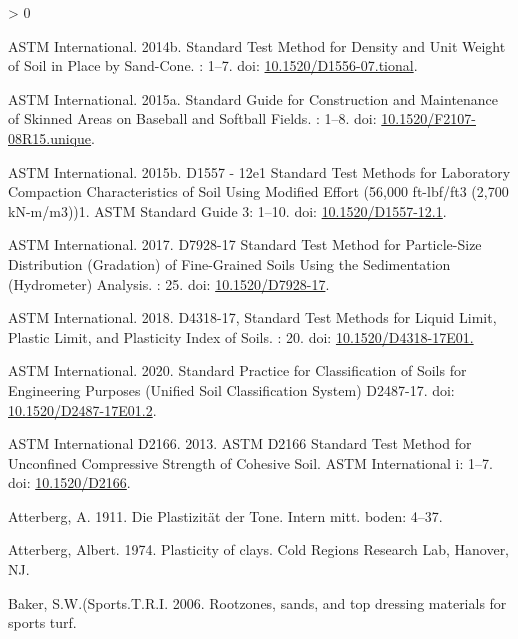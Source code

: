 \documentclass[
  letterpaper,
  openany]{book}
\newlength{\cslhangindent}
\newenvironment{CSLReferences}[2] %
 {%
  \setlength{\parindent}{0pt}
  \ifodd #1 \everypar{\setlength{\hangindent}{\cslhangindent}}\ignorespaces\fi
  \ifnum #2 > 0
  \setlength{\parskip}{#2\baselineskip}
  \fi
 }%
 {}
\begin{document}
\begin{CSLReferences}{1}{0}
\leavevmode\hypertarget{ref-ASTMD1556-07}{}%
ASTM International. 2014b. {Standard Test Method for Density and Unit Weight of Soil in Place by Sand-Cone}. : 1--7. doi: \href{https://doi.org/10.1520/D1556-07.tional}{10.1520/D1556-07.tional}.

\leavevmode\hypertarget{ref-ASTMF2107-08}{}%
ASTM International. 2015a. {Standard Guide for Construction and Maintenance of Skinned Areas on Baseball and Softball Fields}. : 1--8. doi: \href{https://doi.org/10.1520/F2107-08R15.unique}{10.1520/F2107-08R15.unique}.

\leavevmode\hypertarget{ref-ASTMD15572015}{}%
ASTM International. 2015b. {D1557 - 12e1 Standard Test Methods for Laboratory Compaction Characteristics of Soil Using Modified Effort (56,000 ft-lbf/ft3 (2,700 kN-m/m3))1}. ASTM Standard Guide 3: 1--10. doi: \href{https://doi.org/10.1520/D1557-12.1}{10.1520/D1557-12.1}.

\leavevmode\hypertarget{ref-ASTMD79282017}{}%
ASTM International. 2017. {D7928-17 Standard Test Method for Particle-Size Distribution (Gradation) of Fine-Grained Soils Using the Sedimentation (Hydrometer) Analysis}. : 25. doi: \href{https://doi.org/10.1520/D7928-17}{10.1520/D7928-17}.

\leavevmode\hypertarget{ref-ASTMD43182018}{}%
ASTM International. 2018. {D4318-17, Standard Test Methods for Liquid Limit, Plastic Limit, and Plasticity Index of Soils}. : 20. doi: \href{https://doi.org/10.1520/D4318-17E01.}{10.1520/D4318-17E01.}

\leavevmode\hypertarget{ref-ASTMD2487-17}{}%
ASTM International. 2020. {Standard Practice for Classification of Soils for Engineering Purposes (Unified Soil Classification System) D2487-17}. doi: \href{https://doi.org/10.1520/D2487-17E01.2}{10.1520/D2487-17E01.2}.

\leavevmode\hypertarget{ref-ASTMD2166M-13}{}%
ASTM International D2166. 2013. {ASTM D2166 Standard Test Method for Unconfined Compressive Strength of Cohesive Soil}. ASTM International i: 1--7. doi: \href{https://doi.org/10.1520/D2166}{10.1520/D2166}.

\leavevmode\hypertarget{ref-Atterberg1911}{}%
Atterberg, A. 1911. {Die Plastizit{ä}t der Tone}. Intern mitt. boden: 4--37.

\leavevmode\hypertarget{ref-Atterberg1974}{}%
Atterberg, Albert. 1974. {Plasticity of clays}. Cold Regions Research Lab, Hanover, NJ.

\leavevmode\hypertarget{ref-Baker2006}{}%
Baker, S.W.(Sports.T.R.I. 2006. {Rootzones, sands, and top dressing materials for sports turf}.


\end{CSLReferences}
\end{document}
